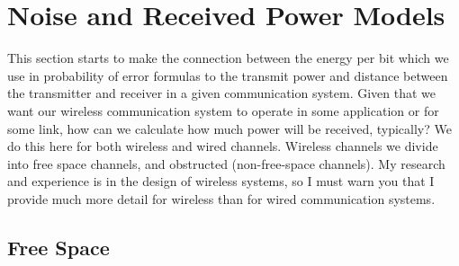


\section{Noise and Received Power Models}

This section starts to make the connection between the energy per bit which we use in probability of error formulas to the transmit power and distance between the transmitter and receiver in a given communication system.  Given that we want our wireless communication system to operate in some application or for some link, how can we calculate how much power will be received, typically?  We do this here for both wireless and wired channels.  Wireless channels we divide into free space channels, and obstructed (non-free-space channels).  My research and experience is in the design of wireless systems, so I must warn you that I provide much more detail for wireless than for wired communication systems.

\subsection{Free Space}

